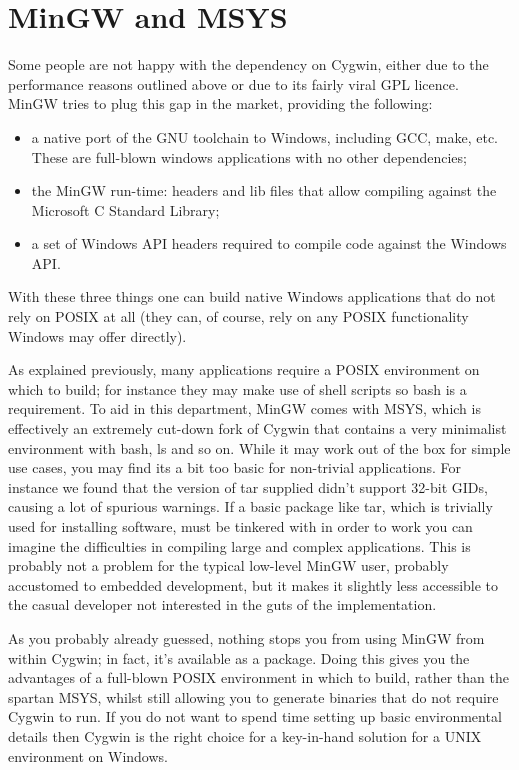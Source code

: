 \documentclass{book}
\begin{document}
\section{MinGW and MSYS}

Some people are not happy with the dependency on Cygwin, either due to
the performance reasons outlined above or due to its fairly viral GPL
licence. MinGW tries to plug this gap in the market, providing the
following:

\begin{itemize}
\item a native port of the GNU toolchain to Windows, including GCC, make, etc. These are full-blown windows applications with no other dependencies;
\item the MinGW run-time: headers and lib files that allow compiling against the Microsoft C Standard Library;
\item a set of Windows API headers required to compile code against the Windows API.
\end{itemize}

With these three things one can build native Windows applications that
do not rely on POSIX at all (they can, of course, rely on any POSIX
functionality Windows may offer directly).

As explained previously, many applications require a POSIX environment
on which to build; for instance they may make use of shell scripts so
bash is a requirement. To aid in this department, MinGW comes with
MSYS, which is effectively an extremely cut-down fork of Cygwin that
contains a very minimalist environment with bash, ls and so on. While
it may work out of the box for simple use cases, you may find its a
bit too basic for non-trivial applications. For instance we found that
the version of tar supplied didn't support 32-bit GIDs, causing a lot
of spurious warnings. If a basic package like tar, which is trivially
used for installing software, must be tinkered with in order to work
you can imagine the difficulties in compiling large and complex
applications. This is probably not a problem for the typical low-level
MinGW user, probably accustomed to embedded development, but it makes
it slightly less accessible to the casual developer not interested in
the guts of the implementation.

As you probably already guessed, nothing stops you from using MinGW
from within Cygwin; in fact, it's available as a package. Doing this
gives you the advantages of a full-blown POSIX environment in which to
build, rather than the spartan MSYS, whilst still allowing you to
generate binaries that do not require Cygwin to run. If you do not
want to spend time setting up basic environmental details then Cygwin
is the right choice for a key-in-hand solution for a UNIX environment
on Windows.
\end{document}
